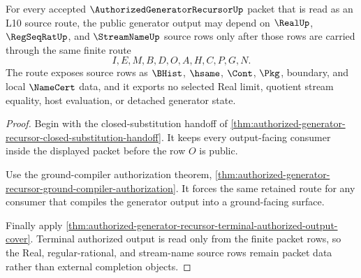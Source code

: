 \begin{theorem}
\label{thm:authorized-generator-recursor-real-stream-route}
For every accepted $\AuthorizedGeneratorRecursorUp$ packet that is read as an L10 source route, the public generator output may depend on $\RealUp$, $\RegSeqRatUp$, and $\StreamNameUp$ source rows only after those rows are carried through the same finite route
$$
I,E,M,B,D,O,A,H,C,P,G,N.
$$
The route exposes source rows as $\BHist$, $\hsame$, $\Cont$, $\Pkg$, boundary, and local $\NameCert$ data, and it exports no selected Real limit, quotient stream equality, host evaluation, or detached generator state.
\end{theorem}
\begin{proof}
Begin with the closed-substitution handoff of \autoref{thm:authorized-generator-recursor-closed-substitution-handoff}. It keeps every output-facing consumer inside the displayed packet before the row $O$ is public.

Use the ground-compiler authorization theorem, \autoref{thm:authorized-generator-recursor-ground-compiler-authorization}. It forces the same retained route for any consumer that compiles the generator output into a ground-facing surface.

Finally apply \autoref{thm:authorized-generator-recursor-terminal-authorized-output-cover}. Terminal authorized output is read only from the finite packet rows, so the Real, regular-rational, and stream-name source rows remain packet data rather than external completion objects.
\end{proof}


